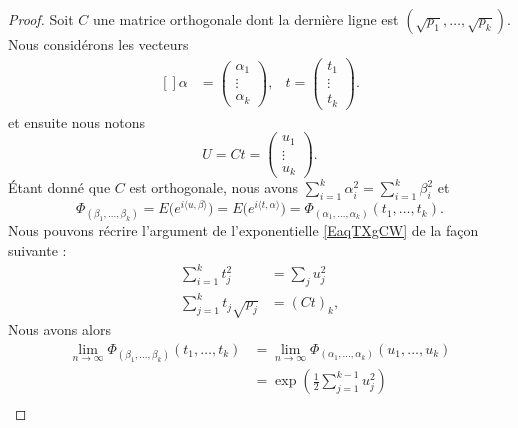\begin{proof}
	Soit \( C\) une matrice orthogonale dont la dernière ligne est \( (\sqrt{p_1},\ldots, \sqrt{p_k})\). Nous considérons les vecteurs
	\begin{equation}
		\begin{aligned}[]
			\alpha & =\begin{pmatrix}
				          \alpha_1 \\
				          \vdots   \\
				          \alpha_k
			          \end{pmatrix},
			       & t=\begin{pmatrix}
				           t_1    \\
				           \vdots \\
				           t_k
			           \end{pmatrix}.
		\end{aligned}
	\end{equation}
	et ensuite nous notons
	\begin{equation}
		U=Ct=\begin{pmatrix}
			u_1    \\
			\vdots \\
			u_k
		\end{pmatrix}.
	\end{equation}
	Étant donné que \( C\) est orthogonale, nous avons \( \sum_{i=1}^k\alpha_i^2=\sum_{i=1}^k\beta_i^2\) et
	\begin{equation}
		\Phi_{(\beta_1,\ldots, \beta_k)}=E\big(  e^{i\langle u, \beta\rangle } \big)=E\big(  e^{i\langle t, \alpha\rangle } \big)=\Phi_{(\alpha_1,\ldots, \alpha_k)}(t_1,\ldots, t_k).
	\end{equation}
	Nous pouvons récrire l'argument de l'exponentielle \eqref{EaqTXgCW} de la façon suivante :
	\begin{subequations}
		\begin{align}
			\sum_{i=1}^kt_j^2         & =\sum_ju_j^2 \\
			\sum_{j=1}^kt_j\sqrt{p_j} & =(Ct)_{k},
		\end{align}
	\end{subequations}
	Nous avons alors
	\begin{subequations}
		\begin{align}
			\lim_{n\to \infty} \Phi_{(\beta_1,\ldots, \beta_k)}(t_1,\ldots, t_k) & =\lim_{n\to \infty} \Phi_{(\alpha_1,\ldots, \alpha_k)}(u_1,\ldots, u_k) \\
			                                                                     & =\exp\left( \frac{ 1 }{2}\sum_{j=1}^{k-1}u_j^2 \right)                  \\

\end{align}
\end{subequations}
\end{proof}
